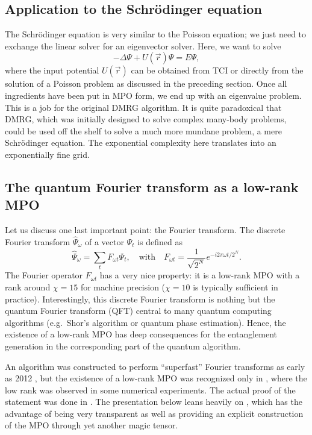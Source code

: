 \documentclass{SciPost}
\begin{document}
\subsection{Application to the Schrödinger equation}
The Schrödinger equation is very similar to the Poisson equation; we just need to exchange the linear solver for an eigenvector solver. Here, we want to solve
\begin{equation}
- \Delta \Psi +  U(\vec r) \Psi = E \Psi,
\end{equation}
where the input potential $U(\vec r)$ can be obtained from TCI or directly from the solution of a Poisson problem as discussed in the preceding section. Once all ingredients have been put in MPO form, we end up with an eigenvalue problem. This is a job for the original DMRG algorithm. It is quite paradoxical that DMRG, which was initially designed to solve complex many-body problems, could be used off the shelf to solve a much more mundane problem, a mere Schrödinger equation. The exponential complexity here translates into an exponentially fine grid.

\subsection{The quantum Fourier transform as a low-rank MPO}
Let us discuss one last important point: the Fourier transform. The discrete Fourier transform $\hat \Psi_\omega$ of a vector $\Psi_t$ is defined as
\begin{equation}
\hat \Psi_\omega = \sum_t F_{\omega t} \Psi_t,\quad\text{with}\quad F_{\omega t} = \frac{1}{\sqrt{2^N}} e^{-i2\pi \omega t/2^N}.
\end{equation}
The Fourier operator $F_{\omega t}$ has a very nice property: it is a low-rank MPO with a rank around $\chi=15$ for machine precision ($\chi=10$ is typically sufficient in practice). Interestingly, this discrete Fourier transform is nothing but the quantum Fourier transform (QFT) central to many quantum computing algorithms (e.g.\ Shor's algorithm or quantum phase estimation). Hence, the existence of a low-rank MPO has deep consequences for the entanglement generation in the corresponding part of the quantum algorithm.

An algorithm was constructed to perform ``superfast'' Fourier transforms as early as 2012 \cite{dolgov2012}, but the existence of a low-rank MPO was recognized only in \cite{woolfe2014}, where the low rank was observed in some numerical experiments. The actual proof of the statement was done in \cite{chen2023}. The presentation below leans heavily on \cite{chen2024}, which has the advantage of being very transparent as well as providing an explicit construction of the MPO through yet another magic tensor.
\end{document}
